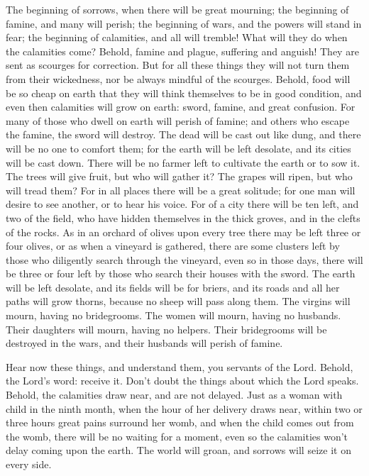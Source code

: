  The beginning of sorrows, when there will be great
mourning; the beginning of famine, and many will perish; the beginning
of wars, and the powers will stand in fear; the beginning of calamities,
and all will tremble! What will they do when the calamities come?
 Behold, famine and plague, suffering and anguish! They are
sent as scourges for correction.  But for all these things
they will not turn them from their wickedness, nor be always mindful of
the scourges.  Behold, food will be so cheap on earth that
they will think themselves to be in good condition, and even then
calamities will grow on earth: sword, famine, and great confusion.
 For many of those who dwell on earth will perish of
famine; and others who escape the famine, the sword will destroy.
 The dead will be cast out like dung, and there will be no
one to comfort them; for the earth will be left desolate, and its cities
will be cast down.  There will be no farmer left to
cultivate the earth or to sow it.  The trees will give
fruit, but who will gather it?  The grapes will ripen, but
who will tread them? For in all places there will be a great solitude;
 for one man will desire to see another, or to hear his
voice.  For of a city there will be ten left, and two of
the field, who have hidden themselves in the thick groves, and in the
clefts of the rocks.  As in an orchard of olives upon every
tree there may be left three or four olives,  or as when a
vineyard is gathered, there are some clusters left by those who
diligently search through the vineyard,  even so in those
days, there will be three or four left by those who search their houses
with the sword.  The earth will be left desolate, and its
fields will be for briers, and its roads and all her paths will grow
thorns, because no sheep will pass along them.  The virgins
will mourn, having no bridegrooms. The women will mourn, having no
husbands. Their daughters will mourn, having no helpers. 
Their bridegrooms will be destroyed in the wars, and their husbands will
perish of famine.

 Hear now these things, and understand them, you servants
of the Lord.  Behold, the Lord's word: receive it. Don't
doubt the things about which the Lord speaks.  Behold, the
calamities draw near, and are not delayed.  Just as a woman
with child in the ninth month, when the hour of her delivery draws near,
within two or three hours great pains surround her womb, and when the
child comes out from the womb, there will be no waiting for a moment,
 even so the calamities won't delay coming upon the earth.
The world will groan, and sorrows will seize it on every side.

